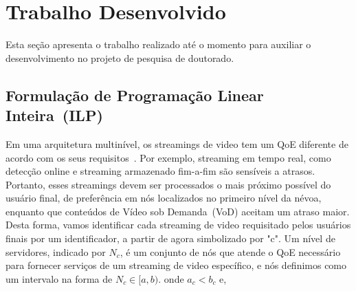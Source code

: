 \clearpage
\section{Trabalho Desenvolvido}
\label{ch:developed}

Esta seção apresenta o trabalho realizado até o momento para auxiliar o desenvolvimento 
no projeto de pesquisa de doutorado. 



%

\subsection{Formulação de Programação Linear Inteira~(ILP)}
\label{subsec:applications}

Em uma arquitetura multinível, os streamings de video tem um QoE diferente de acordo com os seus requisitos~\cite{judyLATINCOM2017}. Por exemplo, streaming em tempo real, como detecção online e streaming armazenado fim-a-fim são sensíveis a atrasos. Portanto, esses streamings devem ser processados o mais próximo possível do usuário final, de preferência em nós localizados no primeiro nível da névoa, enquanto que conteúdos de Vídeo sob Demanda~(VoD) aceitam um atraso maior. Desta forma, vamos identificar cada streaming de video requisitado pelos usuários finais por um identificador, a partir de agora simbolizado por "c".
Um nível de servidores, indicado por $N_{c}$, é um conjunto de nós que atende o QoE necessário para fornecer serviços de um streaming de video específico, e nós definimos como um intervalo na forma de $N_{c} \in [a, b)$. onde $a_{c} < b_{c}$ e,

